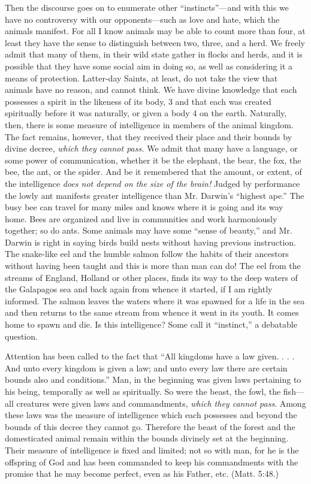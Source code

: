 Then the discourse goes on to enumerate other ``instincts''—and with this we have no
controversy with our opponents—such as love and hate, which the animals manifest. For all I
know animals may be able to count more than four, at least they have the sense to distinguish
between two, three, and a herd. We freely admit that many of them, in their wild state gather
in flocks and herds, and it is possible that they have some social aim in doing so, as well as
considering it a means of protection. Latter-day Saints, at least, do not take the view that
animals have no reason, and cannot think. We have divine knowledge that each possesses a
spirit in the likeness of its body, 3 and that each was created spiritually before it was
naturally, or given a body 4 on the earth. Naturally, then, there is some measure of
intelligence in members of the animal kingdom. The fact remains, however, that they
received their place and their bounds by divine decree, \textit{which they cannot pass.} We admit
that many have a language, or some power of communication, whether it be the elephant, the
bear, the fox, the bee, the ant, or the spider. And be it remembered that the amount, or extent,
of the intelligence \textit{does not depend on the size of the brain!} Judged by performance the lowly
ant manifests greater intelligence than Mr. Darwin's ``highest ape.'' The busy bee can travel
for many miles and knows where it is going and its way home. Bees are organized and live in
communities and work harmoniously together; so do ants. Some animals may have some
``sense of beauty,'' and Mr. Darwin is right in saying birds build nests without having
previous instruction. The snake-like eel and the humble salmon follow the habits of their
ancestors without having been taught and this is more than man can do! The eel from the
streams of England, Holland or other places, finds its way to the deep waters of the
Galapagos sea and back again from whence it started, if I am rightly informed. The salmon
leaves the waters where it was spawned for a life in the sea and then returns to the same
stream from whence it went in its youth. It comes home to spawn and die. Is this
intelligence? Some call it ``instinct,'' a debatable question.

Attention has been called to the fact that ``All kingdoms have a law given. . . . And unto every
kingdom is given a law; and unto every law there are certain bounds also and conditions.''
Man, in the beginning was given laws pertaining to his being, temporally as well as
spiritually. So were the beast, the fowl, the fish—all creatures were given laws and
commandments, \textit{which they cannot pass}. Among these laws was the measure of intelligence
which each possesses and beyond the bounds of this decree they cannot go. Therefore the
beast of the forest and the domesticated animal remain within the bounds divinely set at the
beginning. Their measure of intelligence is fixed and limited; not so with man, for he is the
offspring of God and has been commanded to keep his commandments with the promise that
he may become perfect, even as his Father, etc. (Matt. 5:48.)

